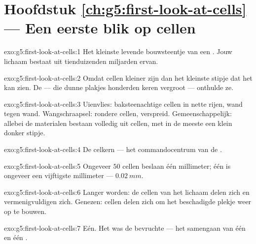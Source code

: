 \section*{Hoofdstuk \ref{ch:g5:first-look-at-cells} --- Een eerste blik op cellen}

\begin{solution}{exo:g5:first-look-at-cells:1}
Het kleinste levende bouwsteentje van een . Jouw lichaam
bestaat uit tienduizenden miljarden ervan.
\end{solution}

\begin{solution}{exo:g5:first-look-at-cells:2}
Omdat cellen kleiner zijn dan het kleinste stipje dat het  kan zien.
De  --- die dunne plakjes honderden keren vergroot --- onthulde ze.
\end{solution}

\begin{solution}{exo:g5:first-look-at-cells:3}
Uienvlies: baksteenachtige cellen in nette rijen, wand tegen wand.
Wangschraapsel: rondere cellen, verspreid. Gemeenschappelijk: allebei de
materialen bestaan volledig uit cellen, met in de meeste een klein
donker stipje.
\end{solution}

\begin{solution}{exo:g5:first-look-at-cells:4}
De celkern --- het commandocentrum van de .
\end{solution}

\begin{solution}{exo:g5:first-look-at-cells:5}
Ongeveer $50$ cellen beslaan één millimeter; één  is ongeveer een
vijftigste millimeter --- $\qty{0.02}{mm}$.
\end{solution}

\begin{solution}{exo:g5:first-look-at-cells:6}
Langer worden: de cellen van het lichaam delen zich en vermenigvuldigen
zich. Genezen: cellen delen zich om het beschadigde plekje weer op te bouwen.
\end{solution}

\begin{solution}{exo:g5:first-look-at-cells:7}
Eén. Het was de bevruchte  --- het samengaan van één  en één
.
\end{solution}

